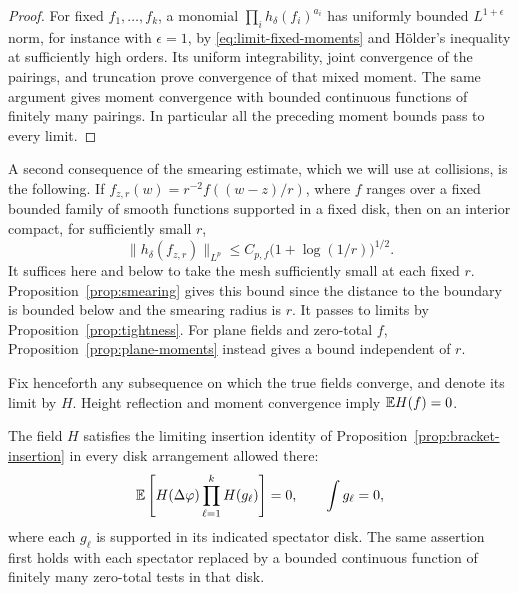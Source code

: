 \begin{proof}
For fixed \(f_1,\ldots,f_k\), a monomial
\(\prod_i h_\delta(f_i)^{a_i}\) has uniformly bounded \(L^{1+\epsilon}\)
norm, for instance with \(\epsilon=1\), by
\eqref{eq:limit-fixed-moments} and H\"older's inequality at sufficiently
high orders.  Its uniform integrability, joint convergence of the
pairings, and truncation prove convergence of that mixed moment.
The same argument gives moment convergence with bounded continuous
functions of finitely many pairings.  In particular all the preceding
moment bounds pass to every limit.
\end{proof}

A second consequence of the smearing estimate, which we will use at
collisions, is the following.  If
\(f_{z,r}(w)=r^{-2}f((w-z)/r)\), where \(f\) ranges over a fixed bounded
family of smooth functions supported in a fixed disk, then on an
interior compact, for sufficiently small \(r\),
\begin{equation}
 \|h_\delta(f_{z,r})\|_{L^p}
 \le C_{p,f}\bigl(1+\log(1/r)\bigr)^{1/2}.
 \label{eq:limit-small-moments}
\end{equation}
It suffices here and below to take the mesh sufficiently small at each
fixed \(r\).  Proposition~\ref{prop:smearing} gives this bound since
the distance to the boundary is bounded below and the smearing radius
is \(r\).  It passes to limits by Proposition~\ref{prop:tightness}.
For plane fields and zero-total \(f\), Proposition~\ref{prop:plane-moments}
instead gives a bound independent of \(r\).

Fix henceforth any subsequence on which the true fields converge,
and denote its limit by \(H\).  Height reflection and moment
convergence imply \(\mathbb E H(f)=0\).

\begin{lemma}
\label{limit:transfer}
The field \(H\) satisfies the limiting insertion identity of
Proposition~\ref{prop:bracket-insertion} in every disk arrangement
allowed there:
\begin{equation}
 \mathbb E\left[H(\Delta\varphi)
          \prod_{\ell=1}^k H(g_\ell)\right]=0,
 \qquad \int g_\ell=0,
 \label{eq:limit-insertion}
\end{equation}
where each \(g_\ell\) is supported in its indicated spectator disk.
The same assertion first holds with each spectator replaced by a
bounded continuous function of finitely many zero-total tests in that
disk.
\end{lemma}

